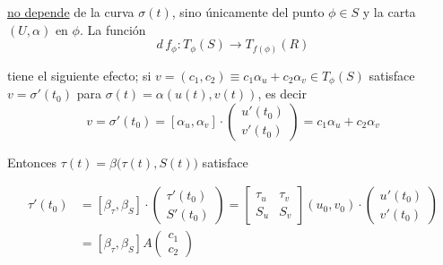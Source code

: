 \documentclass{article}
\theoremstyle{definition}
\begin{document}
    \underline{no depende} de la curva $\sigma(t)$, sino únicamente del punto $\phi \in S$ y la carta $(U, \alpha)$ en $\phi$.
    La función 
    \begin{equation*}
      d\, f_\phi: T_\phi (S) \to T_{f(\phi)}(R)
    \end{equation*}

    tiene el siguiente efecto; si $v = (c_1, c_2) \equiv c_1 \alpha_u + c_2 \alpha_v \in T_\phi (S)$ satisface
    $v = \sigma'(t_0)$ para $\sigma(t) =  \alpha(u(t), v(t))$, es decir 
    \begin{equation*}
      v = \sigma'(t_0) = [\alpha_u, \alpha_v] \cdot
      \begin{pmatrix}
          u'(t_0) \\
          v'(t_0)
      \end{pmatrix} = c_1 \alpha_u + c_2 \alpha_v
    \end{equation*}

    Entonces $\tau(t) = \beta\bigl(\tau(t), S(t)\bigr)$ satisface 

    \begin{equation*}
      \begin{aligned}
        \tau'(t_0) &= [\beta_\tau, \beta_S] \cdot 
        \begin{pmatrix}
            \tau'(t_0) \\
            S'(t_0)
        \end{pmatrix}
        = \begin{bmatrix}
            \tau_u & \tau_v \\
            S_u & S_v
        \end{bmatrix}
        (u_0, v_0)\cdot 
        \begin{pmatrix}
            u'(t_0) \\
            v'(t_0)
        \end{pmatrix} \\
        &= [\beta_\tau, \beta_S] A
        \begin{pmatrix}
            c_1 \\
            c_2
        \end{pmatrix}
      \end{aligned}
    \end{equation*}
\end{document}
